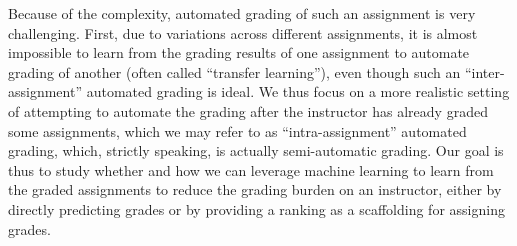 Because of the complexity, automated grading of such an assignment is very
challenging. First, due to variations across different assignments, it is
almost impossible to learn from the grading results of one assignment to
automate grading of another (often called ``transfer learning''), even
though such an ``inter-assignment'' automated grading is ideal.  We thus
focus on a more realistic setting of attempting to automate the grading
after the instructor has already graded some assignments, which we may
refer to as ``intra-assignment'' automated grading, which, strictly
speaking, is actually semi-automatic grading.  Our goal is thus to study
whether and how we can leverage machine learning to learn from the graded
assignments to reduce the grading burden on an instructor, either by
directly predicting grades or by providing a ranking as a scaffolding for
assigning grades.
